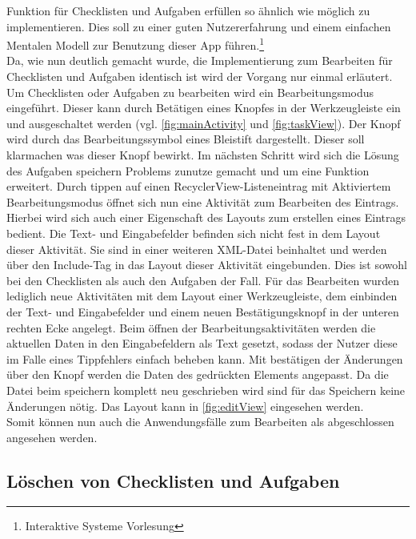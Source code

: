 Funktion für Checklisten und Aufgaben erfüllen so ähnlich wie möglich zu implementieren. Dies soll zu einer guten Nutzererfahrung und einem einfachen Mentalen Modell zur Benutzung dieser App führen.\footnote{Interaktive Systeme Vorlesung}\\
Da, wie nun deutlich gemacht wurde, die Implementierung zum Bearbeiten für Checklisten und Aufgaben identisch ist wird der Vorgang nur einmal erläutert. Um Checklisten oder Aufgaben zu bearbeiten wird ein Bearbeitungsmodus eingeführt. Dieser kann durch Betätigen eines Knopfes in der Werkzeugleiste ein und ausgeschaltet werden (vgl. \autoref{fig:mainActivity} und \autoref{fig:taskView}). Der Knopf wird durch das Bearbeitungssymbol eines Bleistift dargestellt. Dieser soll klarmachen was dieser Knopf bewirkt. Im nächsten Schritt wird sich die Lösung des Aufgaben speichern Problems zunutze gemacht und um eine Funktion erweitert. Durch tippen auf einen RecyclerView-Listeneintrag mit Aktiviertem Bearbeitungsmodus öffnet sich nun eine Aktivität zum Bearbeiten des Eintrags. Hierbei wird sich auch einer Eigenschaft des Layouts zum erstellen eines Eintrags bedient. Die Text- und Eingabefelder befinden sich nicht fest in dem Layout dieser Aktivität. Sie sind in einer weiteren XML-Datei beinhaltet und werden über den Include-Tag in das Layout dieser Aktivität eingebunden. Dies ist sowohl bei den Checklisten als auch den Aufgaben der Fall. Für das Bearbeiten wurden lediglich neue Aktivitäten mit dem Layout einer Werkzeugleiste, dem einbinden der Text- und Eingabefelder und einem neuen Bestätigungsknopf in der unteren rechten Ecke angelegt. Beim öffnen der Bearbeitungsaktivitäten werden die aktuellen Daten in den Eingabefeldern als Text gesetzt, sodass der Nutzer diese \zB im Falle eines Tippfehlers einfach beheben kann. Mit bestätigen der Änderungen über den Knopf werden die Daten des gedrückten Elements angepasst. Da die Datei beim speichern komplett neu geschrieben wird sind für das Speichern keine Änderungen nötig. Das Layout kann in \autoref{fig:editView} eingesehen werden.\\
Somit können nun auch die Anwendungsfälle zum Bearbeiten als abgeschlossen angesehen werden.

\subsection{Löschen von Checklisten und Aufgaben}\label{subsec:löschen}

